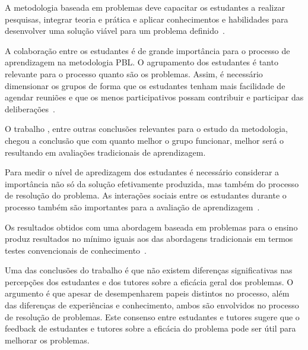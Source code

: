 
A metodologia baseada em problemas deve capacitar os estudantes a
realizar pesquisas, integrar teoria e prática e aplicar conhecimentos
e habilidades para desenvolver uma solução viável para
um problema definido~\cite{savery2015overview}.


A colaboração entre os estudantes é de grande importância para o
processo de aprendizagem na metodologia PBL.
O agrupamento dos estudantes é tanto relevante para o processo quanto
são os problemas. Assim, é necessário dimensionar os grupos de forma
que os estudantes tenham mais facilidade de agendar reuniões e que
os menos participativos possam contribuir e participar das
deliberações~\cite{savery2015overview, albanese2010problem}.

O trabalho \cite{van2000motivation}, entre outras conclusões
relevantes para o estudo da metodologia, chegou a conclusão
que com quanto melhor o grupo funcionar, melhor será o
resultando em avaliações tradicionais de aprendizagem.

Para medir o nível de apredizagem dos estudantes é necessário considerar
a importância não só da solução efetivamente produzida, mas também do
processo de resolução do problema.
As interações sociais entre os estudantes durante
o processo também são importantes para a
avaliação de aprendizagem~\cite{albanese2010problem}.

Os resultados obtidos com uma abordagem baseada em problemas para o ensino
produz resultados no mínimo iguais aos das abordagens tradicionais em
termos testes convencionais de conhecimento~\cite{savery2015overview}.


Uma das conclusões do trabalho \cite{sockalingam2011student} é que
não existem diferenças significativas nas percepções dos estudantes
e dos tutores sobre a eficácia geral dos problemas.
O argumento é que apesar de desempenharem papeis distintos
no processo, além das diferenças de experiências e conhecimento,
ambos são envolvidos no processo de resolução de problemas.
Este consenso entre estudantes e tutores sugere que o feedback de estudantes
e tutores sobre a eficácia do problema pode ser útil para melhorar
os problemas.

